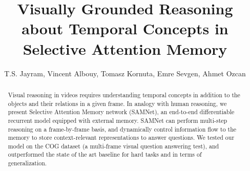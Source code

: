 \documentclass{article}
\title{Visually Grounded Reasoning about Temporal Concepts in Selective Attention Memory}
\author{T.S. Jayram, Vincent Albouy, Tomasz Kornuta, Emre Sevgen, Ahmet Ozcan}
\theoremstyle{remark}
\theoremstyle{definition}
\begin{document}
\maketitle
\begin{abstract}
Visual reasoning in videos requires understanding temporal concepts in addition to the objects and their relations in a given frame.  
In analogy with human reasoning, we present Selective Attention Memory network (SAMNet), an end-to-end differentiable recurrent 
model equipped with external memory.  
SAMNet can perform multi-step reasoning on a frame-by-frame basis, and dynamically control information flow to the memory 
to store context-relevant representations to answer questions. 
We tested our model on the COG dataset (a multi-frame visual question answering test), and outperformed the state of 
the art baseline for hard tasks and in terms of generalization.
\end{abstract}




\newpage


\newpage

	
\end{document}
